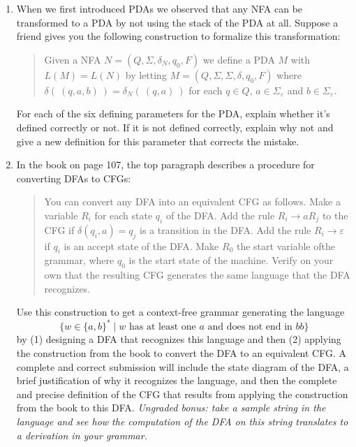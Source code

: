 \begin{enumerate}[wide, labelwidth=!, labelindent=0pt]
\begin{enumerate}

\item\gradeComplete When we first introduced PDAs we observed 
that any NFA can be transformed to a PDA by not using the stack 
of the PDA at all. Suppose a friend gives you the following construction
to formalize this transformation:

\begin{quote}
Given a NFA $N = (Q, \Sigma, \delta_N, q_0, F)$ we define a PDA $M$
with $L(M) = L(N)$ by letting $M = ( Q, \Sigma, \Sigma, \delta, q_0, F)$ where 
$\delta(~(q,a,b)~) = \delta_N(~(q,a)~)$ for each $q \in Q$, 
$a \in \Sigma_{\varepsilon}$ and $b \in \Sigma_{\varepsilon}$.
\end{quote}

For each of the six defining parameters for the PDA, explain whether 
it's defined correctly or not. If it is not defined correctly, 
explain why not and give a new definition for this parameter that 
corrects the mistake.

\item\gradeCorrectFirst In the book on page 107, the top paragraph describes a procedure for converting DFAs to CFGs:
\begin{quote}
   You can convert any DFA into an equivalent CFG as follows. 
   Make a variable $R_i$ for each state $q_i$ of the DFA. Add the rule $R_i \to aR_j$ to the
   CFG if $\delta(q_i,a) =q_j$ is a transition in the DFA. Add the rule
   $R_i\to \varepsilon$ if $q_i$ is an accept state of the DFA. Make $R_0$ the start variable ofthe grammar, 
   where $q_0$ is the start state of the machine. Verify on your own that the resulting CFG 
   generates the same language that the DFA recognizes.
\end{quote}

Use this construction to get a context-free grammar generating the language 
\[
    \{ w \in \{a,b\}^* \mid w \text{ has at least one $a$ and does not end in  $bb$}\}
\]
by (1) designing a DFA that recognizes this language and then (2) applying the construction from the book to convert the 
DFA to an equivalent CFG. A complete and correct submission will include the state diagram of the DFA, a brief justification of why 
it recognizes the language, and then the complete and precise definition of the CFG that results from applying the construction 
from the book to this DFA. {\it Ungraded bonus: take a sample string in the language and see how the computation of 
the DFA on this string translates to a derivation in your grammar.}


\end{enumerate}
\end{enumerate}
